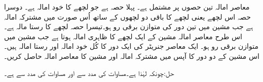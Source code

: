معاصر امالہ تین حصوں پر مشتمل ہے۔ پہلا حصہ  ہے جو  لچھے کا خود امالہ ہے۔ دوسرا حصہ   اس لچھے یعنی  لچھے کا باقی دو لچھوں کے ساتھ اُس صورت میں مشترکہ امالہ ہے جب مشین میں تین دور کی متوازن برقی رو ہو۔تیسرا حصہ  لچھے   کا رستا مالہ ہے۔ اس طرح معاصر امالہ مشین کے ایک لچھے کا ظاہری امالہ ہوتا ہے جب مشین میں متوازن برقی رو ہو۔
%
ایک معاصر جنریٹر کی ایک دور کا کُل خود امالہ  اور رستا امالہ  ہیں۔اس مشین کے دو دور کا آپس میں مشترکہ امالہ اور مشین کا معاصر امالہ حاصل کریں۔

حل:چونکہ   لہٰذا  ہے۔مساوات  کی مدد سے   اور مساوات  کی مدد سے   ہے۔
%

